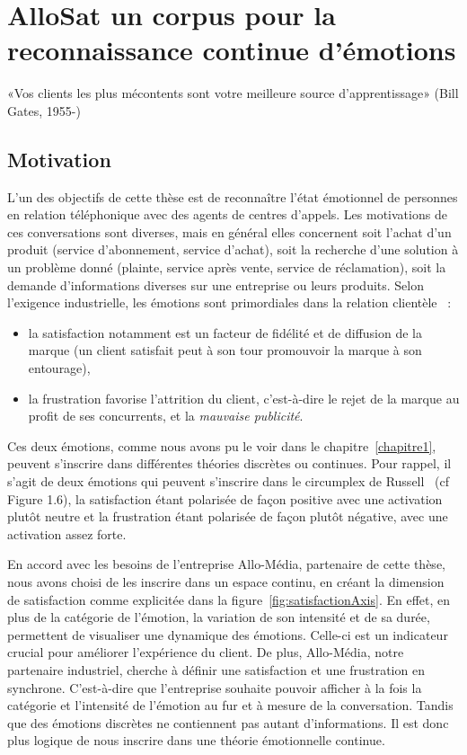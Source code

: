 \chapter{AlloSat un corpus pour la reconnaissance continue d'émotions}
\label{chapitre4}
«Vos clients les plus mécontents sont votre meilleure source d’apprentissage»  (Bill Gates, 1955-)

\section{Motivation}
L'un des objectifs de cette thèse est de reconnaître l'état émotionnel de personnes en relation téléphonique avec des agents de centres d'appels. Les motivations de ces conversations sont diverses, mais en général elles concernent soit l'achat d'un produit (service d'abonnement, service d'achat), soit la recherche d'une solution à un problème donné (plainte, service après vente, service de réclamation), soit la demande d'informations diverses sur une entreprise ou leurs produits. Selon l'exigence industrielle, les émotions sont primordiales dans la relation clientèle~\cite{Tumbat2011} :
\begin{itemize}
  \item la satisfaction notamment est un facteur de fidélité et de diffusion de la marque (un client satisfait peut à son tour promouvoir la marque à son entourage),
  \item la frustration favorise l'attrition du client, c'est-à-dire le rejet de la marque au profit de ses concurrents, et la \textit{mauvaise publicité}.
\end{itemize}
Ces deux émotions, comme nous avons pu le voir dans le chapitre~\ref{chapitre1}, peuvent s'inscrire dans différentes théories discrètes ou continues. Pour rappel, il s'agit de deux émotions qui peuvent s'inscrire dans le circumplex de Russell~\cite{Russell1980} (cf Figure 1.6), la satisfaction étant polarisée de façon positive avec une activation plutôt neutre et la frustration étant polarisée de façon plutôt négative, avec une activation assez forte.

En accord avec les besoins de l'entreprise Allo-Média, partenaire de cette thèse, nous avons choisi de les inscrire dans un espace continu, en créant la dimension de satisfaction comme explicitée dans la figure~\ref{fig:satisfactionAxis}. En effet, en plus de la catégorie de l'émotion, la variation de son intensité et de sa durée, permettent de visualiser une dynamique des émotions. Celle-ci est un indicateur crucial pour améliorer l'expérience du client. De plus, Allo-Média, notre partenaire industriel, cherche à définir une satisfaction et une frustration en synchrone. C'est-à-dire que l'entreprise souhaite pouvoir afficher à la fois la catégorie et l'intensité de l'émotion au fur et à mesure de la conversation. Tandis que des émotions discrètes ne contiennent pas autant d'informations. Il est donc plus logique de nous inscrire dans une théorie émotionnelle continue.

